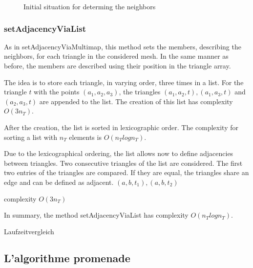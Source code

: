 \documentclass[10pt]{article}
\begin{document}
\begin{figure}[h]  
	\begin{minipage}{0.4\textwidth}
	\caption{Initial situation for determing the neighbors}
	\end{minipage}


\end{figure}


\subsubsection{setAdjacencyViaList} \label{list}
As in setAdjacencyViaMultimap, this method sets the members, describing the neighbors, for each triangle in the considered mesh. In the same manner as before, the members are described using their position in the triangle array.

The idea is to store each triangle, in varying order, three times in a list. For the triangle $t$ with the points $(a_1,a_2,a_3)$, the triangles $(a_1,a_2,t), (a_1,a_3,t)$ and $(a_2,a_3,t)$ are appended to the list. The creation of this list has complexity $O(3n_T)$.

After the creation, the list is sorted in lexicographic order. The complexity for sorting a list with $n_T$ elements is $O(n_Tlogn_T)$.

Due to the lexicographical ordering, the list allows now to define adjacencies between triangles. Two consecutive triangles of the list are considered. The first two entries of the triangles are compared. If they are equal, the triangles share an edge and can be defined as adjacent. $(a,b,t_1), (a,b,t_2)$

complexity $O(3n_T)$

In summary, the method setAdjacencyViaList has complexity $O(n_Tlogn_T)$.

Laufzeitvergleich

\subsection{L'algorithme promenade} \label{promenade}
\end{document}
